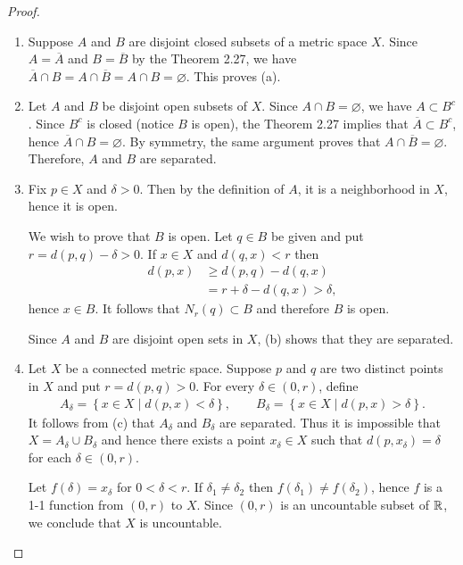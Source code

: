 \begin{proof}\,
\begin{enumerate} 
\item[(a)] Suppose $A$ and $B$ are disjoint closed subsets of a metric space $X$. 
Since $A = \overline{A}$ and $B= \overline{B}$ by the Theorem 2.27, we have $\overline{A} \cap B=A \cap \overline{B}=A \cap B = \varnothing$.
This proves (a).
\item[(b)] Let $A$ and $B$ be disjoint open subsets of $X$.
Since $A \cap B = \varnothing$, we have $A \subset B^c$. 
Since $B^c$ is closed (notice $B$ is open), the Theorem 2.27 implies that $\overline{A} \subset B^c$, hence $\overline{A} \cap B = \varnothing$.
By symmetry, the same argument proves that $A \cap \overline{B} = \varnothing$.
Therefore, $A$ and $B$ are separated.
\item[(c)] Fix $p \in X$ and $\delta>0$.
Then by the definition of $A$, it is a neighborhood in $X$, hence it is open.

We wish to prove that $B$ is open.
Let $q \in B$ be given and put $r=d(p,q)-\delta>0$.
If $x \in X$ and $d(q,x)<r$ then 
\begin{align*}
    d(p,x) & \geq d(p,q) - d(q,x) \\
    &=r+\delta -d(q,x)>\delta,
\end{align*}
hence $x \in B$.
It follows that $N_r(q) \subset B$ and therefore $B$ is open.

Since $A$ and $B$ are disjoint open sets in $X$, (b) shows that they are separated.
\item[(d)] Let $X$ be a connected metric space.
Suppose $p$ and $q$ are two distinct points in $X$ and put $r=d(p,q)>0$.
For every $\delta \in (0,r)$, define 
\begin{align*}
A_{\delta}=\left\{x \in X \mid d(p,x)<\delta\right\}, \qquad B_{\delta}=\left\{x \in X \mid d(p,x)>\delta\right\}.
\end{align*}
It follows from (c) that $A_{\delta}$ and $B_{\delta}$ are separated.
Thus it is impossible that $X=A_{\delta} \cup B_{\delta}$ and hence there exists a point $x_{\delta} \in X$ such that $d(p,x_{\delta})=\delta$ for each $\delta \in (0,r)$.

Let $f(\delta)=x_{\delta}$ for $0<\delta<r$.
If $\delta_1 \neq \delta_2$ then $f(\delta_1) \neq f(\delta_2)$, hence $f$ is a 1-1 function from $(0,r)$ to $X$.
Since $(0,r)$ is an uncountable subset of $\mathbb{R}$, we conclude that $X$ is uncountable.
\end{enumerate}
\end{proof}

